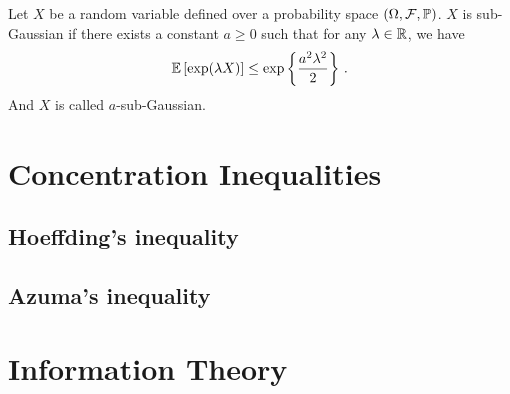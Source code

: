 \begin{definition}
\begin{leftbar}[defnbar]
Let $X$ be a random variable defined over a probability space $(\Omega,\mathcal{F},\mathbb{P})$. $X$ is sub-Gaussian if there exists a constant $a\geq 0$ such that for any $\lambda\in\mathbb{R}$, we have
\[
    \mathbb{E}\left[\exp(\lambda X)\right] \leq \exp\left\{\frac{a^2\lambda^2}{2}\right\}\,.
\]
And $X$ is called $a$-sub-Gaussian.
\end{leftbar}
\end{definition}


\section{Concentration Inequalities}\label{app:maths.concentration}

\subsection{Hoeffding's inequality}

\subsection{Azuma's inequality}



\section{Information Theory}\label{app:maths.information}

